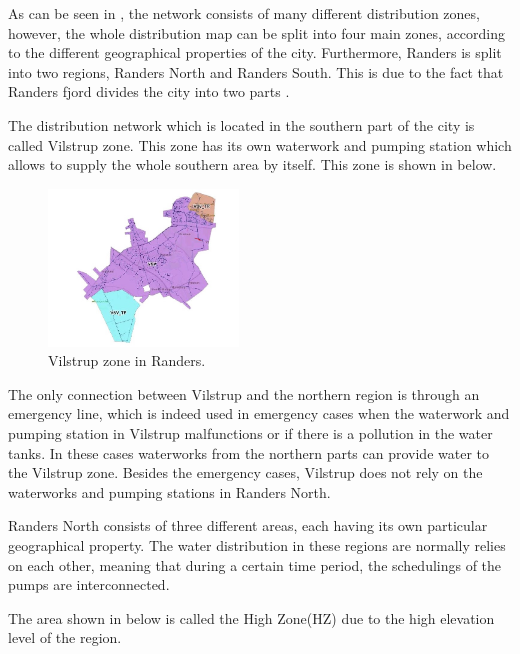 As can be seen in , the network consists of many different distribution zones, however, the whole distribution map can be split into four main zones, according to the different geographical properties of the city. Furthermore, Randers is split into two regions, Randers North and Randers South. This is due to the fact that Randers fjord divides the city into two parts\cite{verdo} . 

The distribution network which is located in the southern part of the city is called Vilstrup zone. This zone has its own waterwork and pumping station which allows to supply the whole southern area by itself. This zone is shown in  below.

\begin{figure}[H]
\centering
\includegraphics[width=0.45\textwidth]{report/pictures/Vilstrup_region}
\caption{Vilstrup zone in Randers.}
\label{fig:vilstrup_region}
\end{figure}

The only connection between Vilstrup and the northern region is through an emergency line, which is indeed used in emergency cases when the waterwork and pumping station in Vilstrup malfunctions or if there is a pollution in the water tanks. In these cases waterworks from the northern parts can provide water to the Vilstrup zone. Besides the emergency cases, Vilstrup does not rely on the waterworks and pumping stations in Randers North.  

Randers North consists of three different areas, each having its own particular geographical property. The water distribution in these regions are normally relies on each other, meaning that during a certain time period, the schedulings of the pumps are interconnected. 

The area shown in  below is called the High Zone(HZ) due to the high elevation level of the region. 

